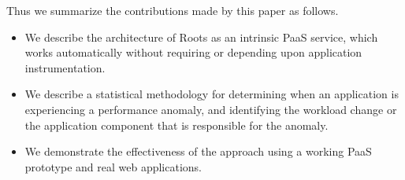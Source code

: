 Thus we summarize the contributions made by this paper as follows.
\begin{itemize}
\item We describe the architecture of Roots as an intrinsic PaaS
service, which works automatically without requiring or depending upon
application instrumentation.
\item We describe a statistical methodology for determining when an
application is experiencing a performance anomaly, and identifying the 
workload change or the application component that is responsible for the anomaly.
\item We demonstrate the effectiveness of the approach using a working PaaS
prototype and real web applications.
\end{itemize}

